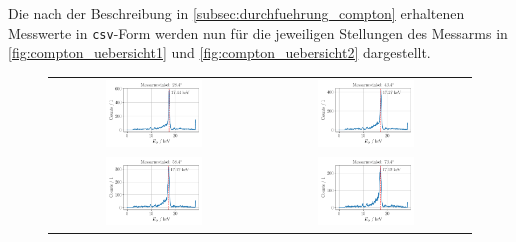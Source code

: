 \documentclass[ngerman]{scrartcl}
\begin{document}
Die nach der Beschreibung in \ref{subsec:durchfuehrung_compton} erhaltenen Messwerte in \texttt{csv}-Form werden nun für die jeweiligen Stellungen des Messarms in \autoref{fig:compton_uebersicht1} und \autoref{fig:compton_uebersicht2} dargestellt.
%
\begin{figure}[H]
    \centering
    \begin{tabular}{cc}
        \includegraphics[width=0.48\textwidth]{../plots/energie_spektren_1.pdf} &
        \includegraphics[width=0.48\textwidth]{../plots/energie_spektren_2.pdf}   \\
        \includegraphics[width=0.48\textwidth]{../plots/energie_spektren_3.pdf} &
        \includegraphics[width=0.48\textwidth]{../plots/energie_spektren_4.pdf}   \\

\end{tabular}
\end{figure}
\end{document}
